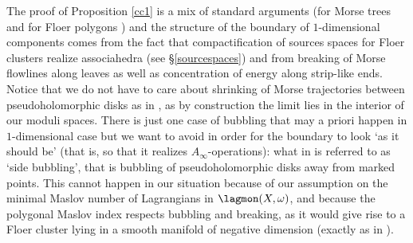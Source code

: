 	The proof of Proposition \ref{cc1} is a mix of standard arguments (for Morse trees \cite{Abouzaid2011APlumbings, Mescher2018PerturbedCohomology} and for Floer polygons \cite{Se:book-fukaya-categ}) and the structure of the boundary of $1$-dimensional components comes from the fact that compactification of sources spaces for Floer clusters realize associahedra (see \S \ref{sourcespaces}) and from breaking of Morse flowlines along leaves as well as concentration of energy along strip-like ends. Notice that we do not have to care about shrinking of Morse trajectories between pseudoholomorphic disks as in \cite{Bi-Co:qrel-long}, as by construction the limit lies in the interior of our moduli spaces. There is just one case of bubbling that may a priori happen in $1$-dimensional case but we want to avoid in order for the boundary to look `as it should be' (that is, so that it realizes $A_\infty$-operations): what in \cite{Bi-Co:qrel-long} is referred to as `side bubbling', that is bubbling of pseudoholomorphic disks away from marked points. This cannot happen in our situation because of our assumption on the minimal Maslov number of Lagrangians in $\lagmon(X,\omega)$, and because the polygonal Maslov index respects bubbling and breaking, as it would give rise to a Floer cluster lying in a smooth manifold of negative dimension (exactly as in \cite{Bi-Co:qrel-long}).\\
	
